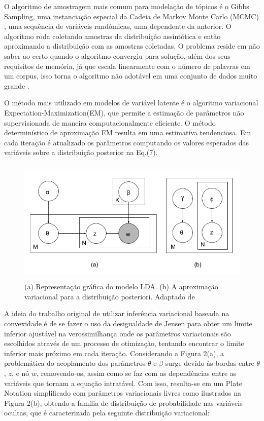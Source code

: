 \documentclass[12pt,a4paper]{article}
\begin{document}
O algoritmo de amostragem mais comum para modelação de tópicos é o Gibbs Sampling, uma instanciação especial da Cadeia de Markov Monte Carlo (MCMC) \cite{jordan1999introduction},
 uma sequência de variáveis randômicas, uma dependente da anterior. O algoritmo roda coletando amostras da distribuição assintótica e então aproximando a distribuição com as amostras coletadas.
 O problema reside em não saber ao certo  quando o algoritmo convergiu para solução, além dos seus requisitos de memória, já que escala linearmente com o número de palavras em um corpus,
 isso torna o algoritmo não adotável em uma conjunto de dados muito grande \cite{vrehuuvrek2011scalability}.

O método mais utilizado em modelos de variável latente é o algoritmo variacional Expectation-Maximization(EM), que permite a estimação de parâmetros não supervisionada de maneira computacionalmente eficiente. O método determinístico de aproximação EM resulta em uma estimativa tendenciosa. Em cada iteração é atualizado os parâmetros computando os valores esperados das variáveis sobre a distribuição posterior na Eq.(7).


\begin{figure}[H]
	\centering
    \includegraphics[height=6cm]{images/figure_2.png}
    \caption{(a) Representação gráfica do modelo LDA. (b) A aproximação variacional para a distribuição posteriori. Adaptado de }
\end{figure}

A ideia do trabalho original de utilizar inferência variacional baseada na convexidade é de se fazer o uso da desigualdade de Jensen para obter um limite inferior ajustável na verossimilhança \cite{jordan1999introduction} onde os parâmetros variacionais são escolhidos através de um processo de otimização,
 tentando encontrar o limite inferior mais próximo em cada iteração. Considerando a Figura 2(a), a problemática do acoplamento dos parâmetros $\theta$ e $\beta$ surge devido às bordas entre $\theta$, $z$,
 e nó $w$, removendo-os, assim como se faz com as dependências entre as variáveis que tornam a equação intratável. Com isso,
 resulta-se em um Plate Notation simplificado com parâmetros variacionais livres como ilustrados na Figura 2(b), obtendo a família de distribuição de probabilidade nas variáveis ocultas,
 que é caracterizada pela seguinte distribuição variacional:
\end{document}
